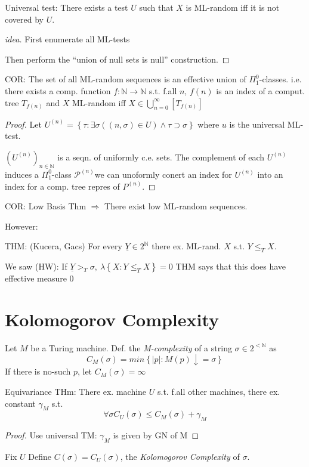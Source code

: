 \documentclass[12pt]{article}
\newcommand{\Nat}{\ensuremath{\mathbb{N}}}
\begin{document}
Universal test:  There exists a test $U$ such that
$X$ is ML-random iff it is not covered by $U$.
\begin{proof}[idea]
  First enumerate all ML-tests

  Then perform the ``union of null sets is null'' construction.
\end{proof}
COR: The set of all ML-random sequences
is an effective union of $\Pi^0_1$-classes.
i.e. there exists a comp. function
$f: \Nat \rightarrow \Nat$
s.t. f.all $n$, $f(n)$ is an index of a comput. tree
$T_{f(n)}$ and $X$ ML-random iff $X \in \bigcup_{n=0}^\infty [T_{f(n)}]$
\begin{proof}
  Let $U^{(n)} = \left\{ \tau : \exists \sigma \left( (n,\sigma) \in U \right) \wedge \tau \supset \sigma \right\}$
  where $u$ is the universal ML-test.

  $\left( U^{(n)} \right)_{n \in \Nat}$ is a seqn. of uniformly c.e. sets.
  The complement of each $U^{(n)}$ induces a $\Pi^0_1$-class $\mathcal{P}^{(n)}$we can unoformly conert an index for $U^(n)$ into an index for a comp. tree repres of $P^{(n)}$.
\end{proof}

COR: Low Basis Thm $\Rightarrow$ There exist low ML-random sequences.


However:

THM: (Kucera, Gacs)
For every $\underline{Y} \in 2^\Nat$ there ex. ML-rand. $X$ s.t. $Y \le_T X$.

We saw (HW): If $\underline{Y} >_T \sigma,\ \lambda\left\{ X : Y \le_T X \right\} = 0$
%
THM says that this does have effective measure 0

\section{Kolomogorov Complexity}
Let $M$ be a Turing machine.
Def. the \emph{M-complexity} of a string $\sigma \in 2^{<\Nat}$ as
\[                       %
C_M(\sigma) = min\left\{ |p| : M(p) \downarrow = \sigma \right\}
\]
If there is no-such $p$, let $C_M(\sigma) = \infty$


Equivariance THm: There ex. machine $U$ s.t. f.all other machines, there
ex. constant $\gamma_M$ s.t.
\[
\forall \sigma C_U(\sigma) \le C_M(\sigma) + \gamma_M
\]
\begin{proof}
  Use universal TM:
  $\gamma_M$ is given by GN of M
\end{proof}
Fix $U$
Define $C(\sigma) = C_U(\sigma)$, the \emph{Kolomogorov Complexity} of $\sigma$.
\end{document}
